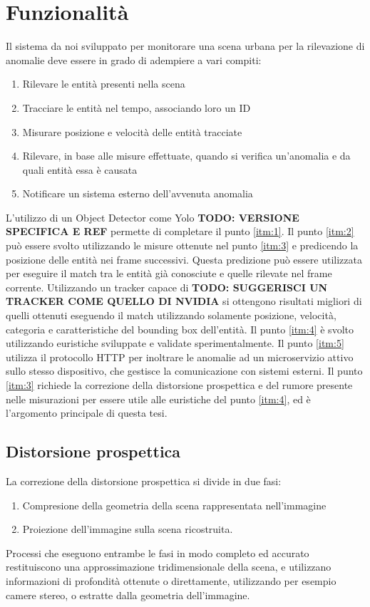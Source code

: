 \chapter{Funzionalità}
\label{sec:funzionalita}

Il sistema da noi sviluppato per monitorare una scena urbana per la rilevazione di anomalie deve essere in grado di adempiere a vari compiti:
\begin{enumerate}
    \item \label{itm:1} Rilevare le entità presenti nella scena
    \item \label{itm:2} Tracciare le entità nel tempo, associando loro un ID
    \item \label{itm:3} Misurare posizione e velocità delle entità tracciate
    \item \label{itm:4} Rilevare, in base alle misure effettuate, quando si verifica un'anomalia e da quali entità essa è causata
    \item \label{itm:5} Notificare un sistema esterno dell'avvenuta anomalia
\end{enumerate}

L'utilizzo di un Object Detector come Yolo \textbf{TODO: VERSIONE SPECIFICA E REF} permette di completare il punto \ref{itm:1}.
Il punto \ref{itm:2} può essere svolto utilizzando le misure ottenute nel punto \ref{itm:3} e predicendo la posizione delle entità nei frame successivi. 
Questa predizione può essere utilizzata per eseguire il match tra le entità già conosciute e quelle rilevate nel frame corrente. 
Utilizzando un tracker capace di \textbf{TODO: SUGGERISCI UN TRACKER COME QUELLO DI NVIDIA} si ottengono risultati migliori di quelli ottenuti eseguendo il match utilizzando solamente posizione, velocità, categoria e caratteristiche del bounding box dell'entità.
Il punto \ref{itm:4} è svolto utilizzando euristiche sviluppate e validate sperimentalmente. 
Il punto \ref{itm:5} utilizza il protocollo HTTP per inoltrare le anomalie ad un microservizio attivo sullo stesso dispositivo, che gestisce la comunicazione con sistemi esterni.
Il punto \ref{itm:3} richiede la correzione della distorsione prospettica e del rumore presente nelle misurazioni per essere utile alle euristiche del punto \ref{itm:4}, ed è l'argomento principale di questa tesi.

\section{Distorsione prospettica}
\label{sec:funzionalita-prospettiva}
La correzione della distorsione prospettica si divide in due fasi:
\begin{enumerate}
    \item Compresione della geometria della scena rappresentata nell'immagine
    \item Proiezione dell'immagine sulla scena ricostruita.
\end{enumerate}
Processi che eseguono entrambe le fasi in modo completo ed accurato restituiscono una approssimazione tridimensionale della scena, e utilizzano informazioni di profondità ottenute o direttamente, utilizzando per esempio camere stereo, o estratte dalla geometria dell'immagine.

